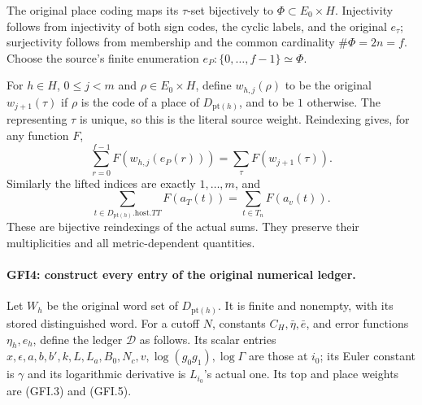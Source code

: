 The original place coding maps its $\tau$-set bijectively to
$\Phi\subset E_0\times H$.  Injectivity follows from injectivity
of both sign codes, the cyclic labels, and the original $e_\tau$;
surjectivity follows from membership and the common cardinality
$\#\Phi=2n=f$.  Choose the source's finite enumeration
$e_P:\{0,\ldots,f-1\}\simeq\Phi$.

For $h\in H$, $0\le j<m$ and $\rho\in E_0\times H$, define
$w_{h,j}(\rho)$ to be the original $w_{j+1}(\tau)$ if $\rho$
is the code of a place of $D_{\mathrm{pt}(h)}$, and to be $1$
otherwise.  The representing $\tau$ is unique, so this is the
literal source weight.  Reindexing gives, for any function $F$,
\[
 \sum_{r=0}^{f-1}F(w_{h,j}(e_P(r)))
 =\sum_\tau F(w_{j+1}(\tau)).                           \tag{GFI.5}
\]
Similarly the lifted indices are exactly $1,\ldots,m$, and
\[
 \sum_{t\in D_{\mathrm{pt}(h)}.\mathrm{host}.TT}F(a_T(t))
 =\sum_{t\in T_n}F(a_v(t)).                              \tag{GFI.6}
\]
These are bijective reindexings of the actual sums.  They preserve
their multiplicities and all metric-dependent quantities.

\paragraph{GFI4: construct every entry of the original numerical ledger.}
\label{claim:GFI4}
Let $W_h$ be the original word set of $D_{\mathrm{pt}(h)}$.
It is finite and nonempty, with its stored distinguished word.
For a cutoff $N$, constants $C_H,\bar\eta,\bar e$, and error
functions $\eta_h,e_h$, define the ledger $\mathscr D$ as follows.
Its scalar entries $x,\epsilon,a,b,b',k,L,L_a,B_0,N_c,v,
\log(g_0g_1),\log\Gamma$ are those at $i_0$; its Euler constant is
$\gamma$ and its logarithmic derivative is $L_{i_0}$'s actual one.
Its top and place weights are (GFI.3) and (GFI.5).


